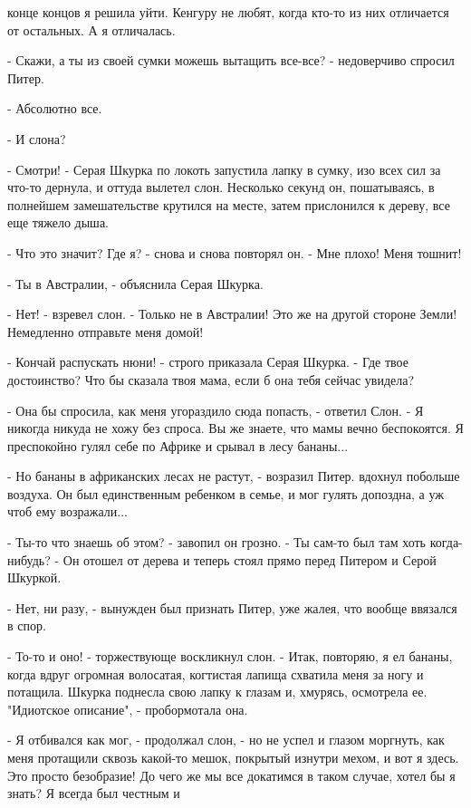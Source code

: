 конце концов я решила уйти. Кенгуру не любят, когда кто-то из них 
отличается от остальных. А я отличалась.
\par- Скажи, а ты из своей сумки можешь вытащить все-все? - 
недоверчиво спросил Питер.
\par- Абсолютно все.
\par- И слона?
\par- Смотри! - Серая Шкурка по локоть запустила лапку в сумку, изо 
всех сил за что-то дернула, и оттуда вылетел слон. Несколько секунд 
он, пошатываясь, в полнейшем замешательстве крутился на месте, затем 
прислонился к дереву, все еще тяжело дыша.
\par- Что это значит? Где я? - снова и снова повторял он. - Мне плохо! 
Меня тошнит!
\par- Ты в Австралии, - объяснила Серая Шкурка.
\par- Нет! - взревел слон. - Только не в Австралии! Это же на другой 
стороне Земли! Немедленно отправьте меня домой!
\par- Кончай распускать нюни! - строго приказала Серая Шкурка. - Где 
твое достоинство? Что бы сказала твоя мама, если б она тебя сейчас 
увидела?
\par- Она бы спросила, как меня угораздило сюда попасть, - ответил 
Слон. - Я никогда никуда не хожу без спроса. Вы же знаете, что мамы 
вечно беспокоятся. Я преспокойно гулял себе по Африке и срывал в лесу 
бананы...
\par- Но бананы в африканских лесах не растут, - возразил Питер.
 вдохнул побольше воздуха. Он был единственным ребенком в 
семье, и мог гулять допоздна, а уж чтоб ему возражали...
\par- Ты-то что знаешь об этом? - завопил он грозно. - Ты сам-то был 
там хоть когда-нибудь? - Он отошел от дерева и теперь стоял прямо 
перед Питером и Серой Шкуркой.
\par- Нет, ни разу, - вынужден был признать Питер, уже жалея, что 
вообще ввязался в спор.
\par- То-то и оно! - торжествующе воскликнул слон. - Итак, повторяю, я 
ел бананы, когда вдруг огромная волосатая, когтистая лапища схватила 
меня за ногу и потащила.
 Шкурка поднесла свою лапку к глазам и, хмурясь, осмотрела 
ее. "Идиотское описание", - пробормотала она.
\par- Я отбивался как мог, - продолжал слон, - но не успел и глазом 
моргнуть, как меня протащили сквозь какой-то мешок, покрытый изнутри 
мехом, и вот я здесь. Это просто безобразие! До чего же мы все 
докатимся в таком случае, хотел бы я знать? Я всегда был честным и 
